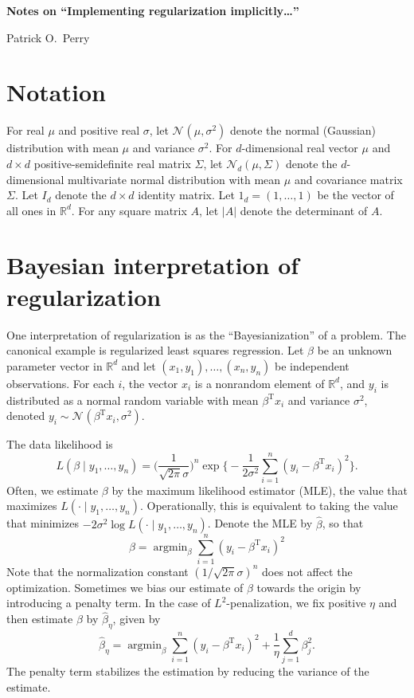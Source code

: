 \documentclass[11pt]{article}
\newcommand{\reals}{\mathbb{R}}
\newcommand{\trans}{\mathrm{T}}
\newcommand{\Normal}[1][]{\mathcal{N}_{#1}}
\DeclareMathOperator*{\argmin}{argmin}
\begin{document}
\begin{center}
    \LARGE{\textbf{%
        Notes on ``Implementing regularization implicitly\ldots''%
    }}
    
    \Large{%
        Patrick O.\ Perry%
    }
\end{center}

\section*{Notation}

For real $\mu$ and positive real $\sigma$, let $\Normal(\mu, \sigma^2)$ denote the
normal (Gaussian) distribution with mean $\mu$ and variance $\sigma^2$.  For
$d$-dimensional real vector $\mu$ and $d \times d$ positive-semidefinite real matrix
$\Sigma$, let $\Normal[d](\mu, \Sigma)$ denote the $d$-dimensional multivariate
normal distribution with mean $\mu$ and covariance matrix $\Sigma$.  Let $I_d$
denote the $d\times d$ identity matrix.  Let $1_d = (1, \ldots, 1)$ be the
vector of all ones in $\reals^d$. For any square matrix $A$, let $|A|$
denote the determinant of $A$.


\section{Bayesian interpretation of regularization}\label{S:Bayesianization}

One interpretation of regularization is as the ``Bayesianization'' of a problem.  
The canonical example is regularized least squares regression.  Let $\beta$
be an unknown parameter vector in $\reals^d$ and let
$(x_1, y_1), \ldots, (x_n, y_n)$ be independent observations.  For each $i$, the
vector $x_i$ is a nonrandom element of $\reals^d$, and $y_i$ is distributed as
a normal random variable with mean $\beta^\trans x_i$ and variance $\sigma^2$,
denoted $y_i \sim \Normal(\beta^\trans x_i, \sigma^2)$.

The data likelihood is
\[
    L(\beta \mid y_1, \ldots, y_n)
    =
    \Big(\frac{1}{\sqrt{2 \pi} \sigma}\Big)^n
    \exp\Big\{
        -\frac{1}{2 \sigma^2} \sum_{i=1}^{n} (y_i - \beta^\trans x_i)^2
    \Big\}.
\]
Often, we estimate $\beta$ by the maximum likelihood estimator (MLE), the value
that maximizes $L(\cdot \mid y_1, \ldots, y_n)$.  Operationally, this is
equivalent to taking the value that minimizes
$-2 \sigma^2 \log L(\cdot \mid y_1, \ldots, y_n)$.  Denote the MLE by
$\hat \beta$, so that
\[
    \hat \beta
        =
        \argmin_\beta
            \sum_{i=1}^{n}
                (y_i - \beta^\trans x_i)^2
\]
Note that the normalization constant $(1/\sqrt{2 \pi} \sigma)^n$ does not affect the
optimization.  Sometimes we bias our estimate of $\beta$ towards the
origin by introducing a penalty term.  In the case of $L^2$-penalization, we
fix positive $\eta$ and then estimate $\beta$ by $\hat \beta_\eta$, given by
\[
    \hat \beta_\eta
        =
        \argmin_\beta
            \sum_{i=1}^{n}
                (y_i - \beta^\trans x_i)^2
            +
            \frac{1}{\eta}
            \sum_{j=1}^{d}
                \beta_j^2.
\]
The penalty term stabilizes the estimation by reducing the variance of
the estimate.
\end{document}
